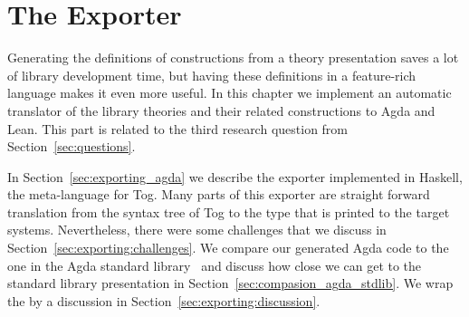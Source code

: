 \chapter{The Exporter}
\label{ch:export}


Generating the definitions of constructions from a theory presentation saves a lot of library development time, but having these definitions in a feature-rich language makes it even more useful. In this chapter we implement an automatic translator of the library theories and their related constructions to Agda and Lean. This part is related to the third research question from Section~\ref{sec:questions}. 

In Section~\ref{sec:exporting_agda} we describe the exporter implemented in Haskell, the meta-language for Tog. Many parts of this exporter are straight forward translation from the syntax tree of Tog to the  type that is printed to the target systems. Nevertheless, there were some challenges that we discuss in Section~\ref{sec:exporting:challenges}. We compare our generated Agda code to the one in the Agda standard library~\cite{agda_stdlib} and discuss how close we can get to the standard library presentation in Section~\ref{sec:compasion_agda_stdlib}. 
We wrap the by a discussion in Section~\ref{sec:exporting:discussion}. 

\begin{comment}
One of the problems we highlight here is how design decisions lead to different presentations of the same theory, forcing developers to rewrite the same mathematical knowledge in different ways. In this chapter, we investigate the following question
\begin{itemize}
\item Given the tog abstract representation, can we export to formal systems with more complex meta theory and design decision. 
\end{itemize}
\end{comment}

